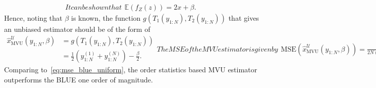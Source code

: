 \documentclass{article}
\newcommand{\E}{\mathbb{E}}
\newcommand{\MSE}{\mathrm{MSE}}
\begin{document}
\begin{subequations}
	It can be shown that
	\begin{align}
	\E(f_Z(z)) = 2x + \beta.
	\end{align}
\end{subequations}
%
%
Hence, noting that $\beta$ is known, the function $g(T_1(y_{1:N}),T_2(y_{1:N}))$ that gives an unbiased estimator should be of the form of
%
%
\begin{subequations}
	\begin{align}
	\hat{x}_{\mathrm{MVU}}^{\mathcal{U}}(y_{1:N},\beta) &= g(T_1(y_{1:N}),T_2(y_{1:N}))\nonumber\\
	&= \frac{1}{2}(y^{(1)}_{1:N}+ y^{(N)}_{1:N}) - \frac{\beta}{2}.
	\end{align}
	The MSE of the MVU estimator is given by
	\begin{align}
	\MSE\left(\hat{x}_{\mathrm{MVU}}^{\mathcal{U}}(y_{1:N},\beta) \right) = \frac{\beta^2}{2N(N+3)+4}.\label{eq:mse_mvu_unif_known}
	\end{align}
\end{subequations}
%
%
Comparing to~\eqref{eq:mse_blue_uniform}, %
the order statistics based MVU estimator outperforms the BLUE one order of magnitude. 
\end{document}
